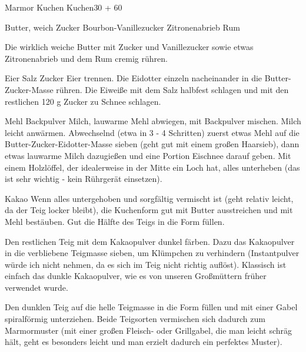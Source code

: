 \begin{MyRecipe}{Marmor Kuchen}{ Kuchen}{\SI{30}{\minuteprime} + \SI{60}{\minuteprime}}
	
	\ingredient[\Calc{0.2}{\x}]{\si{\kilogram}} {Butter, weich}
	\ingredient[\Calc{0.16}{\x}]{\si{\kilogram}} {Zucker}
	\ingredient[\Calc{1}{\x}]{\si{\Paeckchen}} {Bourbon-Vanillezucker}
	\ingredient[\Calc{1}{\x}]{\si{\Messerspitze}} {Zitronenabrieb}
	\ingredient[\Calc{2}{\x}]{\si{\Essloeffel}} {Rum}
	
	Die wirklich weiche Butter mit Zucker und Vanillezucker sowie etwas Zitronenabrieb und dem Rum cremig rühren.
	
	\ingredient[\Calc{6}{\x}]{} {Eier}
	\ingredient[\Calc{1}{\x}]{\si{\Messerspitze}} {Salz}
	\ingredient[\Calc{0.12}{\x}]{\si{\kilogram}} {Zucker}
	Eier trennen. Die Eidotter einzeln nacheinander in die Butter-Zucker-Masse rühren. Die Eiweiße mit dem Salz halbfest schlagen und mit den restlichen 120 g Zucker zu Schnee schlagen.
	
	\ingredient[\Calc{0.28}{\x}]{\si{\kilogram}} {Mehl}
	\ingredient[\Calc{0.5}{\x}]{\si{\Paeckchen}} {Backpulver}
	\ingredient[\Calc{0.1}{\x}]{\si{\liter}} {Milch, lauwarme}
	Mehl abwiegen, mit Backpulver mischen. Milch leicht anwärmen. Abwechselnd (etwa in 3 - 4 Schritten) zuerst etwas Mehl auf die Butter-Zucker-Eidotter-Masse sieben (geht gut mit einem großen Haarsieb), dann etwas lauwarme Milch dazugießen und eine Portion Eischnee darauf geben. Mit einem Holzlöffel, der idealerweise in der Mitte ein Loch hat, alles unterheben (das ist sehr wichtig - kein Rührgerät einsetzen).
	
	\ingredient[\Calc{20}{\x}]{\si{\gram}} {Kakao}
	Wenn alles untergehoben und sorgfältig vermischt ist (geht relativ leicht, da der Teig locker bleibt), die Kuchenform gut mit Butter ausstreichen und mit Mehl bestäuben. Gut die Hälfte des Teigs in die Form füllen.
	
	Den restlichen Teig mit dem Kakaopulver dunkel färben. Dazu das Kakaopulver in die verbliebene Teigmasse sieben, um Klümpchen zu verhindern (Instantpulver würde ich nicht nehmen, da es sich im Teig nicht richtig auflöst). Klassisch ist einfach das dunkle Kakaopulver, wie es von unseren Großmüttern früher verwendet wurde.
	
	Den dunklen Teig auf die helle Teigmasse in die Form füllen und mit einer Gabel spiralförmig unterziehen. Beide Teigsorten vermischen sich dadurch zum Marmormuster (mit einer großen Fleisch- oder Grillgabel, die man leicht schräg hält, geht es besonders leicht und man erzielt dadurch ein perfektes Muster).
	

\end{MyRecipe}

